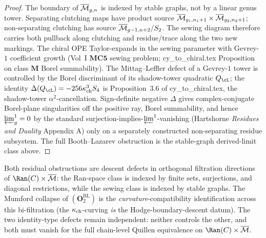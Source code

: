 \begin{proof}
The boundary of $\overline{\mathcal{M}}_{g,n}$ is indexed by stable graphs, not by a
linear genus tower.  Separating clutching maps have product source
$\overline{\mathcal{M}}_{g_1,n_1+1}\times\overline{\mathcal{M}}_{g_2,n_2+1}$; non-separating clutching
has source $\overline{\mathcal{M}}_{g-1,n+2}/S_2$.  The sewing diagram therefore carries
both pullback along clutching and residue/trace along the two new
markings.
The chiral OPE Taylor-expands in the sewing parameter with
Gevrey-$1$ coefficient growth (Vol~I $\mathbf{MC5}$ sewing problem;
cy\_to\_chiral.tex Proposition on class $\mathbf{M}$ Borel
summability). The Mittag--Leffler defect of a Gevrey-$1$ tower
is controlled by the Borel discriminant of its shadow-tower
quadratic $Q_\cL$; the identity $\Delta(Q_\cL) = -256 \kch^3 S_4$
is Proposition~$3.6$ of cy\_to\_chiral.tex, the shadow-tower
$\alpha^2$-cancellation. Sign-definite negative $\Delta$ gives
complex-conjugate Borel-plane singularities off the positive ray,
Borel summability, and hence $\varprojlim^1_g = 0$ by the
standard surjection-implies-$\varprojlim^1$-vanishing
(Hartshorne \emph{Residues and Duality} Appendix A) only on a
separately constructed non-separating residue subsystem.  The full
Booth--Lazarev obstruction is the stable-graph derived-limit class
above.
\end{proof}

\begin{remark}
\label{rem:residual-ml-parallel}
Both residual obstructions are descent defects in orthogonal
filtration directions of $\Ran(C) \times \Mbar$: the Ran-space class
is indexed by finite sets, surjections, and diagonal restrictions,
while the sewing class is indexed by stable graphs. The
Mumford collapse of $(\mathbf{O}_2^{\mathrm{BL}})$ is the
\emph{curvature}-compatibility identification across this bi-filtration
(the $\kappa_{\mathrm{ch}}$-curving \emph{is} the Hodge-boundary-descent datum).
The two identity-type defects remain independent: neither controls
the other, and both must vanish for the full chain-level Quillen
equivalence on $\Ran(C) \times \Mbar$.
\end{remark}

